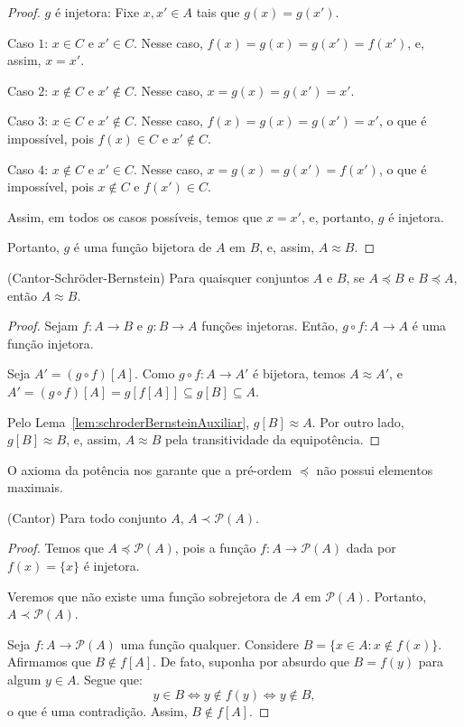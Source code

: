 \begin{proof}
    $g$ é injetora: Fixe $x,x'\in A$ tais que $g(x)=g(x')$.

    Caso $1$: $x\in C$ e $x'\in C$.
    Nesse caso, $f(x)=g(x)=g(x')=f(x')$, e, assim, $x=x'$.

    Caso $2$: $x\notin C$ e $x'\notin C$.
    Nesse caso, $x=g(x)=g(x')=x'$.

    Caso $3$: $x\in C$ e $x'\notin C$.
    Nesse caso, $f(x)=g(x)=g(x')=x'$, o que é impossível, pois $f(x)\in C$ e $x'\notin C$.

    Caso $4$: $x\notin C$ e $x'\in C$.
    Nesse caso, $x=g(x)=g(x')=f(x')$, o que é impossível, pois $x\notin C$ e $f(x')\in C$.

    Assim, em todos os casos possíveis, temos que $x=x'$, e, portanto, $g$ é injetora.

    Portanto, $g$ é uma função bijetora de $A$ em $B$, e, assim, $A\approx B$.
\end{proof}

\begin{theorem}[$Z^-$](Cantor-Schröder-Bernstein)\label{thm:cantorSchroederBernstein}
    Para quaisquer conjuntos $A$ e $B$, se $A\preceq B$ e $B\preceq A$, então $A\approx B$.
\end{theorem}
\begin{proof}
    Sejam $f: A\to B$ e $g: B\to A$ funções injetoras.
    Então, $g\circ f: A\to A$ é uma função injetora.

    Seja $A' = (g\circ f)[A]$.
    Como $g\circ f:A\to A'$ é bijetora, temos $A\approx A'$, e $A'=(g\circ f)[A]=g[f[A]]\subseteq g[B]\subseteq A$.

    Pelo Lema~\ref{lem:schroderBernsteinAuxiliar}, $g[B]\approx A$.
    Por outro lado, $g[B]\approx B$, e, assim, $A\approx B$ pela transitividade da equipotência.
\end{proof}

O axioma da potência nos garante que a pré-ordem $\preceq$ não possui elementos maximais.

\begin{theorem}[$Z^-$](Cantor)\label{thm:cantor}
    Para todo conjunto $A$, $A\prec \mathcal P(A)$.
\end{theorem}
\begin{proof}
    Temos que $A\preceq \mathcal P(A)$, pois a função $f:A\to \mathcal P(A)$ dada por $f(x)=\{x\}$ é injetora.

    Veremos que não existe uma função sobrejetora de $A$ em $\mathcal P(A)$.
    Portanto, $A\prec \mathcal P(A)$.


    Seja $f:A\to \mathcal P(A)$ uma função qualquer.
    Considere $B=\{x\in A : x\notin f(x)\}$.
    Afirmamos que $B\notin f[A]$.
    De fato, suponha por absurdo que $B=f(y)$ para algum $y\in A$.
    Segue que:
    \[
        y\in B \Longleftrightarrow y\notin f(y) \Longleftrightarrow y\notin B,
    \]
    o que é uma contradição.
    Assim, $B\notin f[A]$.
\end{proof}


